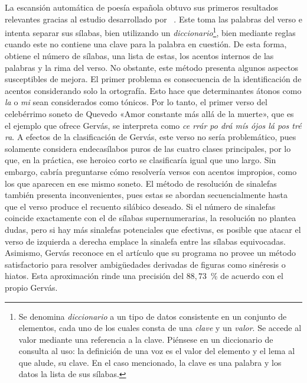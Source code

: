 La escansión automática de poesía española obtuvo sus primeros resultados relevantes gracias al estudio desarrollado por \citeauthor{gervas2000}~\parencite*{gervas2000}. Este toma las palabras del verso e intenta separar sus sílabas, bien utilizando un \textit{diccionario}\footnote{Se denomina \textit{diccionario} a un tipo de datos consistente en un conjunto de elementos, cada uno de los cuales consta de una \textit{clave} y un \textit{valor}. Se accede al valor mediante una referencia a la clave. Piénsese en un diccionario de consulta al uso: la definición de una voz es el valor del elemento y el lema al que alude, su clave. En el caso mencionado, la clave es una palabra y los datos la lista de sus sílabas.}, bien mediante reglas cuando este no contiene una clave para la palabra en cuestión. De esta forma, obtiene el número de sílabas, una lista de estas, los acentos internos de las palabras y la rima del verso. No obstante, este método presenta algunos aspectos susceptibles de mejora. El primer problema es consecuencia de la identificación de acentos considerando solo la ortografía. Esto hace que determinantes átonos como \textit{la} o \textit{mi} sean considerados como tónicos. Por lo tanto, el primer verso del celebérrimo soneto de Quevedo «Amor constante más allá de la muerte», que es el ejemplo que ofrece Gervás, se interpreta como \textit{ce rrár po drá mís ójos lá pos tré ra}. A efectos de la clasificación de Gervás, este verso no sería problemático, pues solamente considera endecasílabos puros de las cuatro clases principales, por lo que, en la práctica, ese heroico corto se clasificaría igual que uno largo. Sin embargo, cabría preguntarse cómo resolvería versos con acentos impropios, como los que aparecen en ese mismo soneto. El método de resolución de sinalefas también presenta inconvenientes, pues estas se abordan secuencialmente hasta que el verso produce el recuento silábico deseado. Si el número de sinalefas coincide exactamente con el de sílabas supernumerarias, la resolución no plantea dudas, pero si hay más sinalefas potenciales que efectivas, es posible que atacar el verso de izquierda a derecha emplace la sinalefa entre las sílabas equivocadas. Asimismo, Gervás reconoce en el artículo que su programa no provee un método satisfactorio para resolver ambigüedades derivadas de figuras como sinéresis o hiatos. Esta aproximación rinde una precisión del $88{,}73$~\% de acuerdo con el propio Gervás.

